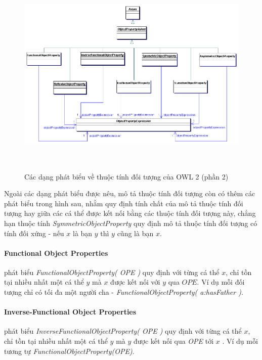 \begin{figure}[h]
	\centering
	\includegraphics[width=150mm, height=100mm]{Figures/objectpropertyAxiom1.png}
	\caption{Các dạng phát biểu về thuộc tính đối tượng của OWL 2 (phần 2) \label{overflow}}
\end{figure}
Ngoài các dạng phát biểu được nêu, mô tả thuộc tính đối tượng còn có thêm các phát biểu trong hình sau, nhằm quy định tính chất của mô tả thuộc tính đối tượng hay giữa các cá thể được kết nối bằng các thuộc tính đối tượng này, chẳng hạn thuộc tính\textit{ SymmetricObjectProperty} quy định mô tả thuộc tính đối tượng có tính đối xứng - nếu $x$ là bạn $y$ thì $y$ cũng là bạn $x$. 

\paragraph{Functional Object Properties} phát biểu \textit{FunctionalObjectProperty( OPE )} quy định với từng cá thể $x$, chỉ tồn tại nhiều nhất một cá thể $y$ mà $x$ được kết nối với $y$ qua $OPE$. Ví dụ mỗi đối tượng chỉ có tối đa một người cha - \textit{FunctionalObjectProperty( a:hasFather )}. 

\paragraph{Inverse-Functional Object Properties} phát biểu \textit{InverseFunctionalObjectProperty( OPE )} quy định với từng cá thể $x$, chỉ tồn tại nhiều nhất một cá thể $y$ mà $y$ được kết nối qua \textit{OPE} tới $x$ . Ví dụ mỗi tương tự \textit{FunctionalObjectProperty(OPE)}.

